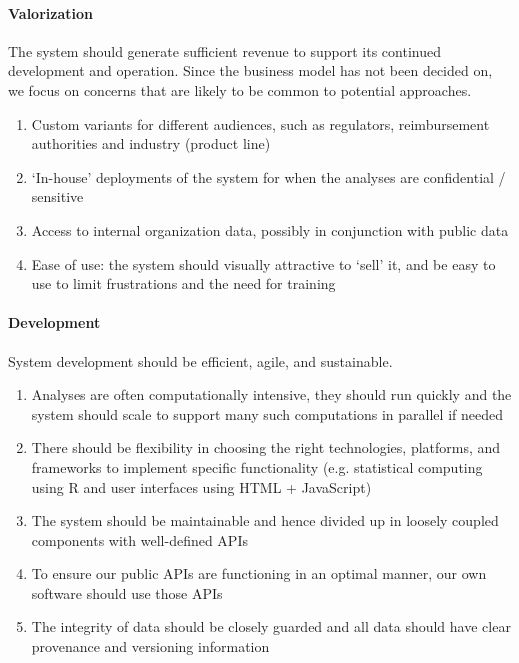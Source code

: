 \documentclass[a4paper]{article}
\begin{document}
\paragraph{Valorization}
The system should generate sufficient revenue to support its continued development and operation.
Since the business model has not been decided on, we focus on concerns that are likely to be common to potential approaches.
\begin{enumerate}[label=V\arabic*]
\item\label{vProductLine} Custom variants for different audiences, such as regulators, reimbursement authorities and industry (product line)
\item\label{vInHouse} `In-house' deployments of the system for when the analyses are confidential / sensitive
\item\label{vSilo} Access to internal organization data, possibly in conjunction with public data
\item\label{vEaseOfUse} Ease of use: the system should visually attractive to `sell' it, and be easy to use to limit frustrations and the need for training
\end{enumerate}

\paragraph{Development}
System development should be efficient, agile, and sustainable.
\begin{enumerate}[label=D\arabic*]
\item\label{dComputation} Analyses are often computationally intensive, they should run quickly and the system should scale to support many such computations in parallel if needed
\item\label{dPlatform} There should be flexibility in choosing the right technologies, platforms, and frameworks to implement specific functionality (e.g. statistical computing using R and user interfaces using HTML + JavaScript)
\item\label{dModular} The system should be maintainable and hence divided up in loosely coupled components with well-defined APIs
\item\label{dDogfood} To ensure our public APIs are functioning in an optimal manner, our own software should use those APIs
\item\label{dIntegrity} The integrity of data should be closely guarded and all data should have clear provenance and versioning information
\end{enumerate}
\end{document}
